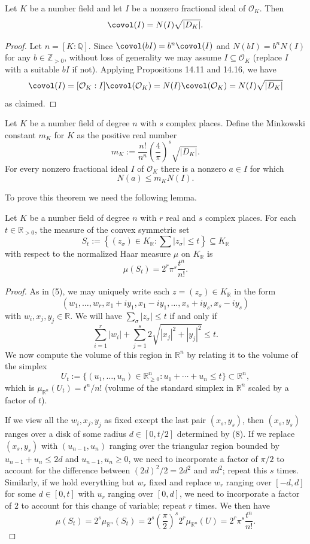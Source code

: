 \begin{corollary}[14.17]
Let $K$ be a number field and let $I$ be a nonzero fractional ideal of $\mathcal O_K$. Then
\[
\covol(I)=N(I)\sqrt{|D_K|}.
\]
\end{corollary}
\begin{proof}
Let $n=[K:\mathbb Q]$. Since $\covol(bI)=b^n\covol(I)$ and $N(bI)=b^nN(I)$ for any $b\in\mathbb Z_{>0}$, without loss of generality we may assume $I\subseteq\mathcal O_K$ (replace $I$ with a suitable $bI$ if not). Applying Propositions 14.11 and 14.16, we have
\[
\covol(I)=[\mathcal O_K:I]\covol(\mathcal O_K)=N(I)\covol(\mathcal O_K)=N(I)\sqrt{|D_K|}
\]
as claimed.
\end{proof}

\begin{theorem}
Let $K$ be a number field of degree $n$ with $s$ complex places. Define the Minkowski constant $m_K$ for $K$ as the positive real number
\[
m_K:=\frac{n!}{n^n}\left(\frac4\pi\right)^s\sqrt{|D_K|}.
\]
For every nonzero fractional ideal $I$ of $\mathcal O_K$ there is a nonzero $a\in I$ for which
\[
N(a)\le m_KN(I).
\]
\end{theorem}
To prove this theorem we need the following lemma.

\begin{lemma}[14.19]
Let $K$ be a number field of degree $n$ with $r$ real and $s$ complex places. For each $t\in\mathbb R_{>0}$, the measure of the convex symmetric set
\[
S_t:=\left\{(z_\sigma)\in K_{\mathbb R}:\sum|z_\sigma|\le t\right\}\subseteq K_{\mathbb R}
\]
with respect to the normalized Haar measure $\mu$ on $K_{\mathbb R}$ is
\[
\mu(S_t)=2^r\pi^s\frac{t^n}{n!}.
\]
\end{lemma}
\begin{proof}
As in (5), we may uniquely write each $z=(z_\sigma)\in K_{\mathbb R}$ in the form
\[
(w_1,\ldots,w_r,x_1+iy_1,x_1-iy_1,\ldots,x_s+iy_s,x_s-iy_s)
\]
with $w_i,x_j,y_j\in\mathbb R$. We will have $\sum_\sigma|z_\sigma|\le t$ if and only if
\[
\sum_{i=1}^r|w_i|+\sum_{j=1}^s2\sqrt{|x_j|^2+|y_j|^2}\le t.\tag{8}
\]
We now compute the volume of this region in $\mathbb R^n$ by relating it to the volume of the simplex
\[
U_t:=\{(u_1,\ldots,u_n)\in\mathbb R_{\ge0}^n:u_1+\cdots+u_n\le t\}\subset\mathbb R^n,
\]
which is $\mu_{\mathbb R^n}(U_t)=t^n/n!$ (volume of the standard simplex in $\mathbb R^n$ scaled by a factor of $t$).

If we view all the $w_i,x_j,y_j$ as fixed except the last pair $(x_s,y_s)$, then $(x_s,y_s)$ ranges over a disk of some radius $d\in[0,t/2]$ determined by (8). If we replace $(x_s,y_s)$ with $(u_{n-1},u_n)$ ranging over the triangular region bounded by $u_{n-1}+u_n\le2d$ and $u_{n-1},u_n\ge0$, we need to incorporate a factor of $\pi/2$ to account for the difference between $(2d)^2/2=2d^2$ and $\pi d^2$; repeat this $s$ times. Similarly, if we hold everything but $w_r$ fixed and replace $w_r$ ranging over $[-d,d]$ for some $d\in[0,t]$ with $u_r$ ranging over $[0,d]$, we need to incorporate a factor of $2$ to account for this change of variable; repeat $r$ times. We then have
\[
\mu(S_t)=2^s\mu_{\mathbb R^n}(S_t)=2^s\left(\frac\pi2\right)^s2^r\mu_{\mathbb R^n}(U)=2^r\pi^s\frac{t^n}{n!}.
\]
\end{proof}

